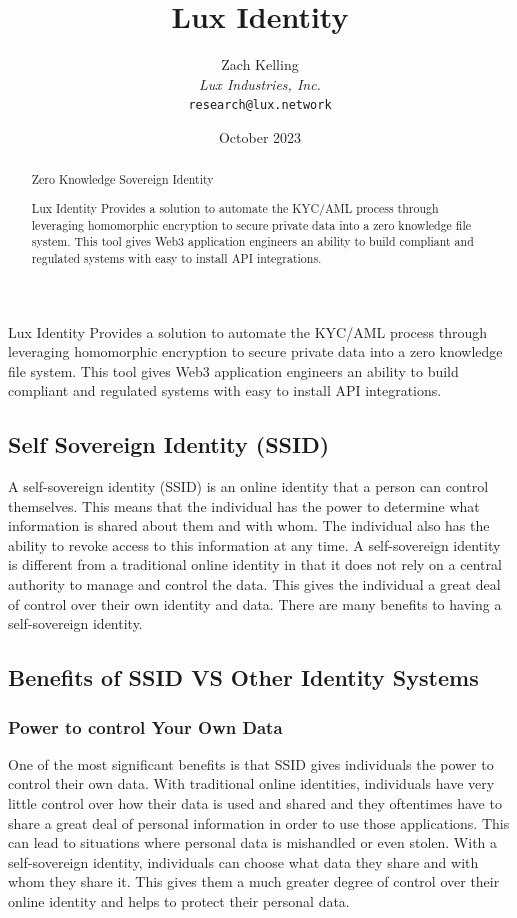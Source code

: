 \documentclass[11pt]{article}
\title{Lux Identity}
\author{Zach Kelling\\\textit{Lux Industries, Inc.}\\\texttt{research@lux.network}}
\date{October 2023}
\begin{document}
\luxcoverpage

\begin{abstract}
Zero Knowledge Sovereign Identity

Lux Identity Provides a solution to automate the KYC/AML process through leveraging homomorphic encryption to secure private data into a zero knowledge file system. This tool gives Web3 application engineers an ability to build compliant and regulated systems with easy to install API integrations.
\end{abstract}

\tableofcontents
\newpage


Lux Identity Provides a solution to automate the KYC/AML process through leveraging homomorphic encryption to secure private data into a zero knowledge file system. This tool gives Web3 application engineers an ability to build compliant and regulated systems with easy to install API integrations.


\subsection{Self Sovereign Identity (SSID)}

A self-sovereign identity (SSID) is an online identity that a person can control themselves. This means that the individual has the power to determine what information is shared about them and with whom. The individual also has the ability to revoke access to this information at any time. A self-sovereign identity is different from a traditional online identity in that it does not rely on a central authority to manage and control the data. This gives the individual a great deal of control over their own identity and data. There are many benefits to having a self-sovereign identity.


\subsection{Benefits of SSID VS Other Identity Systems}

\subsubsection{Power to control Your Own Data}

One of the most significant benefits is that SSID gives individuals the power to control their own data. With traditional online identities, individuals have very little control over how their data is used and shared and they oftentimes have to share a great deal of personal information in order to use those applications. This can lead to situations where personal data is mishandled or even stolen. With a self-sovereign identity, individuals can choose what data they share and with whom they share it. This gives them a much greater degree of control over their online identity and helps to protect their personal data.
\end{document}
